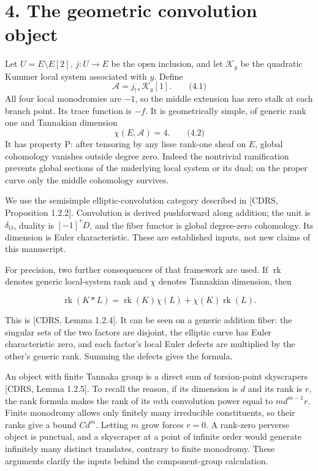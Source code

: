 \documentclass[
  11pt,
  a4paper,
]{article}
\begin{document}
\section{4. The geometric convolution
object}\label{the-geometric-convolution-object}

Let \(U=E\setminus E[2]\), \(j:U\to E\) be the open inclusion, and let
\(\mathcal K_y\) be the quadratic Kummer local system associated with
\(y\). Define \[
\mathcal A=j_{!*}\mathcal K_y[1].
\qquad \text{(4.1)}
\] All four local monodromies are \(-1\), so the middle extension has
zero stalk at each branch point. Its trace function is \(-f\). It is
geometrically simple, of generic rank one and Tannakian dimension \[
\chi(E,\mathcal A)=4.
\qquad \text{(4.2)}
\] It has property P: after tensoring by any lisse rank-one sheaf on
\(E\), global cohomology vanishes outside degree zero. Indeed the
nontrivial ramification prevents global sections of the underlying local
system or its dual; on the proper curve only the middle cohomology
survives.

We use the semisimple elliptic-convolution category described in
{[}CDRS, Proposition 1.2.2{]}. Convolution is derived pushforward along
addition; the unit is \(\delta_O\), duality is \([-1]^*D\), and the
fiber functor is global degree-zero cohomology. Its dimension is Euler
characteristic. These are established inputs, not new claims of this
manuscript.

For precision, two further consequences of that framework are used. If
\(\operatorname{rk}\) denotes generic local-system rank and \(\chi\)
denotes Tannakian dimension, then

\[
\operatorname{rk}(K*L)=\operatorname{rk}(K)\chi(L)+\chi(K)\operatorname{rk}(L).
\]

This is {[}CDRS, Lemma 1.2.4{]}. It can be seen on a generic addition
fiber: the singular sets of the two factors are disjoint, the elliptic
curve has Euler characteristic zero, and each factor's local Euler
defects are multiplied by the other's generic rank. Summing the defects
gives the formula.

An object with finite Tannaka group is a direct sum of torsion-point
skyscrapers {[}CDRS, Lemma 1.2.5{]}. To recall the reason, if its
dimension is \(d\) and its rank is \(r\), the rank formula makes the
rank of its \(m\)th convolution power equal to \(md^{m-1}r\). Finite
monodromy allows only finitely many irreducible constituents, so their
ranks give a bound \(Cd^m\). Letting \(m\) grow forces \(r=0\). A
rank-zero perverse object is punctual, and a skyscraper at a point of
infinite order would generate infinitely many distinct translates,
contrary to finite monodromy. These arguments clarify the inputs behind
the component-group calculation.
\end{document}
